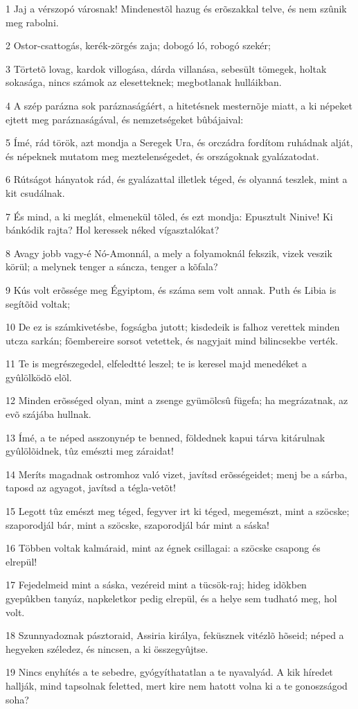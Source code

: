 \par 1 Jaj a vérszopó városnak! Mindenestõl hazug és erõszakkal telve, és nem szûnik meg rabolni.
\par 2 Ostor-csattogás, kerék-zörgés zaja; dobogó ló, robogó szekér;
\par 3 Törtetõ lovag, kardok villogása, dárda villanása, sebesült tömegek, holtak sokasága, nincs számok az elesetteknek; megbotlanak hulláikban.
\par 4 A szép parázna sok paráznaságáért, a hitetésnek mesternõje miatt, a ki népeket ejtett meg paráznaságával, és nemzetségeket bûbájaival:
\par 5 Ímé, rád török, azt mondja a Seregek Ura, és orczádra fordítom ruhádnak alját, és népeknek mutatom meg meztelenségedet, és országoknak gyalázatodat.
\par 6 Rútságot hányatok rád, és gyalázattal illetlek téged, és olyanná teszlek, mint a kit csudálnak.
\par 7 És mind, a ki meglát, elmenekül tõled, és ezt mondja: Epusztult Ninive! Ki bánkódik rajta? Hol keressek néked vígasztalókat?
\par 8 Avagy jobb vagy-é Nó-Amonnál, a mely a folyamoknál fekszik, vizek veszik körül; a melynek tenger a sáncza, tenger a kõfala?
\par 9 Kús volt erõssége meg Égyiptom, és száma sem volt annak. Puth és Libia is segítõid voltak;
\par 10 De ez is számkivetésbe, fogságba jutott; kisdedeik is falhoz verettek minden utcza sarkán; fõembereire sorsot vetettek, és nagyjait mind bilincsekbe verték.
\par 11 Te is megrészegedel, elfeledtté leszel; te is keresel majd menedéket a gyûlölködõ elõl.
\par 12 Minden erõsséged olyan, mint a zsenge gyümölcsû fügefa; ha megrázatnak, az evõ szájába hullnak.
\par 13 Ímé, a te néped asszonynép te benned, földednek kapui tárva kitárulnak gyûlölõidnek, tûz emészti meg záraidat!
\par 14 Meríts magadnak ostromhoz való vizet, javítsd erõsségeidet; menj be a sárba, taposd az agyagot, javítsd a tégla-vetõt!
\par 15 Legott tûz emészt meg téged, fegyver irt ki téged, megemészt, mint a szöcske; szaporodjál bár, mint a szöcske, szaporodjál bár mint a sáska!
\par 16 Többen voltak kalmáraid, mint az égnek csillagai: a szöcske csapong és elrepül!
\par 17 Fejedelmeid mint a sáska, vezéreid mint a tücsök-raj; hideg idõkben gyepûkben tanyáz, napkeletkor pedig elrepül, és a helye sem tudható meg, hol volt.
\par 18 Szunnyadoznak pásztoraid, Assiria királya, feküsznek vitézlõ hõseid; néped a hegyeken széledez, és nincsen, a ki összegyûjtse.
\par 19 Nincs enyhítés a te sebedre, gyógyíthatatlan a te nyavalyád. A kik híredet hallják, mind tapsolnak feletted, mert kire nem hatott volna ki a te gonoszságod soha?


